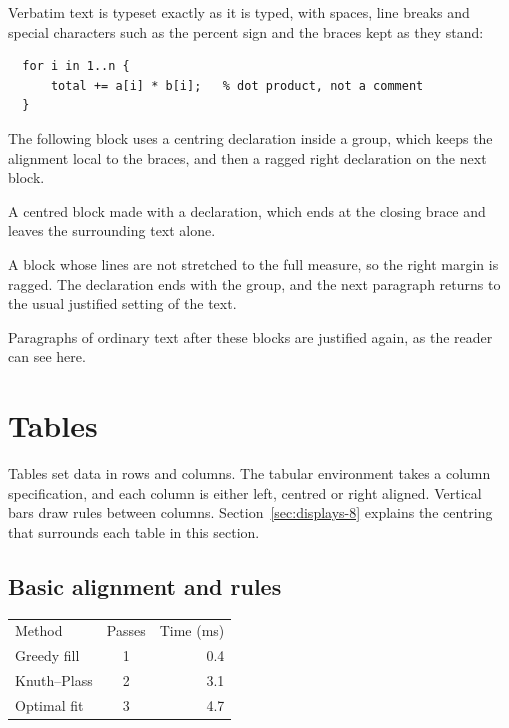 \documentclass{article}
\begin{document}
Verbatim text is typeset exactly as it is typed, with spaces, line breaks and special
characters such as the percent sign and the braces kept as they stand:

\begin{verbatim}
  for i in 1..n {
      total += a[i] * b[i];   % dot product, not a comment
  }
\end{verbatim}

The following block uses a centring declaration inside a group, which keeps the
alignment local to the braces, and then a ragged right declaration on the next block.

{\centering A centred block made with a declaration, which ends at the closing
brace and leaves the surrounding text alone.\par}

{\raggedright A block whose lines are not stretched to the full measure, so the
right margin is ragged. The declaration ends with the group, and the next paragraph
returns to the usual justified setting of the text.\par}

Paragraphs of ordinary text after these blocks are justified again, as the reader can
see here.

\section{Tables}\label{sec:tables-8}

Tables set data in rows and columns. The tabular environment takes a column
specification, and each column is either left, centred or right aligned. Vertical bars
draw rules between columns. Section~\ref{sec:displays-8} explains the centring that surrounds each table in
this section.

\subsection{Basic alignment and rules}\label{sec:tables-basic-8}

\begin{center}
\begin{tabular}{l c r}
Method & Passes & Time (ms) \\
Greedy fill      & 1 & 0.4 \\
Knuth--Plass     & 2 & 3.1 \\
Optimal fit      & 3 & 4.7 \\
\end{tabular}
\end{center}
\end{document}
